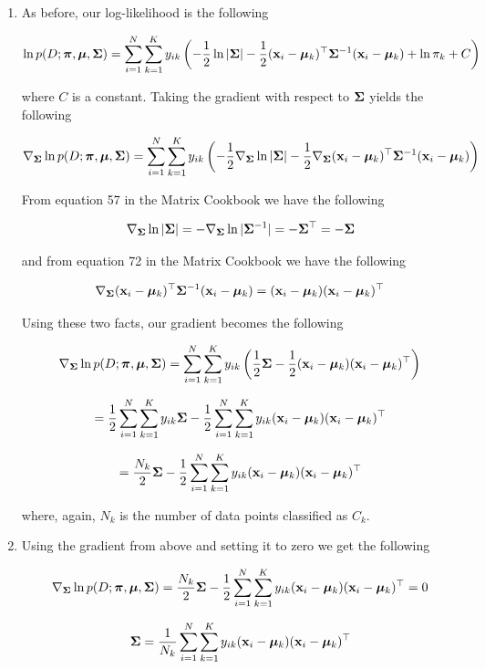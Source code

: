 \documentclass[submit]{harvardml}
\begin{document}
\begin{enumerate}
\item 

As before, our log-likelihood is the following

$$ \ln p(D; \boldsymbol{\pi}, \boldsymbol{\mu}, \mathbf{\Sigma}) = \sum_{i=1}^N \sum_{k=1}^K  y_{ik} \left(  -\frac{1}{2} \ln |\mathbf{\Sigma}| - \frac{1}{2} (\mathbf{x}_i - \boldsymbol{\mu}_k)^\top \mathbf{\Sigma}^{-1} (\mathbf{x}_i - \boldsymbol{\mu}_k) + \ln \pi_k + C\right) $$ 

where $C$ is a constant. Taking the gradient with respect to $\mathbf{\Sigma}$ yields the following

$$ \nabla_{\mathbf{\Sigma}} \ln p(D; \boldsymbol{\pi}, \boldsymbol{\mu}, \mathbf{\Sigma}) = \sum_{i=1}^N \sum_{k=1}^K  y_{ik} \left(  -\frac{1}{2} \nabla_{\mathbf{\Sigma}} \ln |\mathbf{\Sigma}| - \frac{1}{2} \nabla_{\mathbf{\Sigma}} (\mathbf{x}_i - \boldsymbol{\mu}_k)^\top \mathbf{\Sigma}^{-1} (\mathbf{x}_i - \boldsymbol{\mu}_k) \right) $$ 

From equation 57 in the Matrix Cookbook we have the following

$$  \nabla_{\mathbf{\Sigma}} \ln |\mathbf{\Sigma}| =  -\nabla_{\mathbf{\Sigma}} \ln |\mathbf{\Sigma}^{-1}| =  -\mathbf{\Sigma}^{\top} = -\mathbf{\Sigma} $$

and from equation 72 in the Matrix Cookbook we have the following

$$ \nabla_{\mathbf{\Sigma}} (\mathbf{x}_i - \boldsymbol{\mu}_k)^\top \mathbf{\Sigma}^{-1} (\mathbf{x}_i - \boldsymbol{\mu}_k) = (\mathbf{x}_i - \boldsymbol{\mu}_k) (\mathbf{x}_i - \boldsymbol{\mu}_k) ^\top  $$

Using these two facts, our gradient becomes the following

$$ \nabla_{\mathbf{\Sigma}} \ln p(D; \boldsymbol{\pi}, \boldsymbol{\mu}, \mathbf{\Sigma}) = \sum_{i=1}^N \sum_{k=1}^K  y_{ik} \left(  \frac{1}{2} \mathbf{\Sigma}  - \frac{1}{2} (\mathbf{x}_i - \boldsymbol{\mu}_k)(\mathbf{x}_i - \boldsymbol{\mu}_k)^{\top} \right) $$ 

$$ =  \frac{1}{2} \sum_{i=1}^N \sum_{k=1}^K y_{ik} \mathbf{\Sigma}  - \frac{1}{2} \sum_{i=1}^N \sum_{k=1}^K y_{ik} (\mathbf{x}_i - \boldsymbol{\mu}_k)(\mathbf{x}_i - \boldsymbol{\mu}_k)^{\top}  $$

$$ =  \frac{N_k}{2} \mathbf{\Sigma}  - \frac{1}{2} \sum_{i=1}^N \sum_{k=1}^K y_{ik} (\mathbf{x}_i - \boldsymbol{\mu}_k)(\mathbf{x}_i - \boldsymbol{\mu}_k)^{\top}  $$

where, again, $N_k$ is the number of data points classified as $C_k$.

\item 

Using the gradient from above and setting it to zero we get the following

$$\nabla_{\mathbf{\Sigma}} \ln p(D; \boldsymbol{\pi}, \boldsymbol{\mu}, \mathbf{\Sigma}) =  \frac{N_k}{2} \mathbf{\Sigma}  - \frac{1}{2} \sum_{i=1}^N \sum_{k=1}^K y_{ik} (\mathbf{x}_i - \boldsymbol{\mu}_k)(\mathbf{x}_i - \boldsymbol{\mu}_k)^{\top} = 0$$

$$ \mathbf{\Sigma} = \frac{1}{N_k} \sum_{i=1}^N \sum_{k=1}^K y_{ik} (\mathbf{x}_i - \boldsymbol{\mu}_k)(\mathbf{x}_i - \boldsymbol{\mu}_k)^{\top} $$

\end{enumerate}
\end{document}
